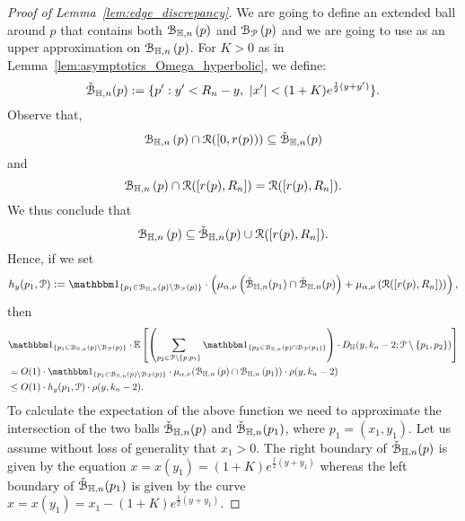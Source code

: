 \begin{proof}[Proof of Lemma~\ref{lem:edge_discrepancy}]
We are going to define an extended ball around $p$ that contains both ${\mathcal B}_{\mathbb{H},n}\left(p\right)$ and ${\mathcal B}_{{\mathcal P}}\left(p\right)$ and we are going to use as an upper approximation on ${\mathcal B}_{\mathbb{H},n}\left(p\right)$.
For $K > 0$ as in Lemma~\ref{lem:asymptotics_Omega_hyperbolic}, we define:
\begin{equation}\label{eq:def_fatball_K}
	\check{{\mathcal B}}_{\mathbb{H},n}(p) : = \{ p^\prime : y^\prime < R_n - y, \ |x^\prime| < (1+K) e^{\frac{1}{2} (y + y^\prime)}  \}.
\end{equation}
Observe that,
\begin{equation*} %
\BallHyp{p} \cap \Rcal ([0,r(p))) \subseteq \FatBallHyp{p}
\end{equation*}
and 
\begin{equation*} %
\BallHyp{p} \cap \Rcal ([r(p),R_n]) = \Rcal ([r(p),R_n]).
\end{equation*}
We thus conclude that 
\begin{equation} \label{eq:ball_inclusions}
{\mathcal B}_{\mathbb{H},n}\left(p\right) \subseteq \check{{\mathcal B}}_{\mathbb{H},n}(p) \cup {\mathcal R}([r(p),R_n]).
\end{equation}
Hence, if we set 
\[
h_y(p_1, \Pcal) := \ind{p_1 \in \BallHyp{p}\setminus \BallPo{p}} \cdot    
\left( \mu_{\alpha,\nu} \left( \FatBallHyp{p_1} \cap \FatBallHyp{p} \right)
+ \mu_{\alpha,\nu} \left( \Rcal([r(p),R_n]) \right) \right),
\]
then 
\begin{equation*}
\begin{split}
&\ind{p_1\in \BallHyp{p}\setminus \BallPo{p}} \cdot \Exp{ \left(\sum_{p_2 \in \Pcal \setminus 
\{p,p_1\}} \ind{p_2 \in \BallHyp{p} \cap \BallPo{p_1}}\right) \cdot 
D_\H (y,k_n-2;\Pcal \setminus \{ p_1, p_2\})
} \\
&=O(1)\cdot
\ind{p_1\in \BallHyp{p}\setminus \BallPo{p}} \cdot \mu_{\alpha,\nu} (\BallHyp{p}\cap \BallHyp{p_1}) \cdot  \rho(y,k_n-2) \\
& \leq O(1) \cdot  h_y (p_1, \Pcal)\cdot  \rho(y,k_n-2). 
\end{split}
\end{equation*}
To calculate the expectation of the above function we need to approximate the 
intersection of the two balls $\check{{\mathcal B}}_{\mathbb{H},n}(p)$ and $\check{{\mathcal B}}_{\mathbb{H},n}(p_1)$, 
where $p_1= (x_1,y_1)$. 
Let us assume without loss of generality that $x_1 > 0$. 
The right boundary of $\check{{\mathcal B}}_{\mathbb{H},n}(p)$ is given by the equation 
$x = x(y_1) = (1+K)e^{\frac{1}{2} (y + y_1)}$ whereas the left boundary of $\check{{\mathcal B}}_{\mathbb{H},n}(p_1)$ is given by the curve $x = x(y_1)= x_1 - (1+ K)e^{\frac{1}{2} (y + y_1)}.$ 


\end{proof}
